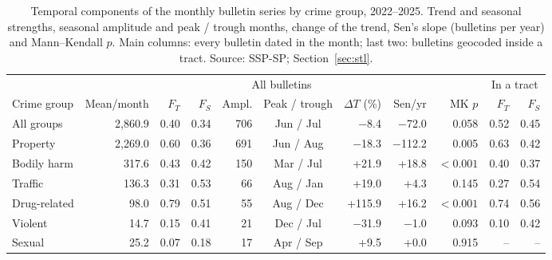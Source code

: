\begin{table}[!ht]
\caption{Temporal components of the monthly bulletin series by crime group, 2022--2025. Trend and seasonal strengths, seasonal amplitude and peak / trough months, change of the trend, Sen's slope (bulletins per year) and Mann--Kendall $p$. Main columns: every bulletin dated in the month; last two: bulletins geocoded inside a tract. Source: SSP-SP; Section~\ref{sec:stl}.}
\label{tab:stl}
\centering\footnotesize
\begin{tabular}{@{}lrrrrcrrrrr@{}}
\hline\hline
 & \multicolumn{8}{c}{All bulletins} & \multicolumn{2}{c}{In a tract} \\
Crime group & Mean/month & $F_T$ & $F_S$ & Ampl. & Peak / trough & $\Delta T$ (\%) & Sen/yr & MK $p$ & $F_T$ & $F_S$ \\
\hline
All groups & 2,860.9 & 0.40 & 0.34 & 706 & Jun / Jul & $-$8.4 & $-$72.0 & 0.058 & 0.52 & 0.45 \\
Property & 2,269.0 & 0.60 & 0.36 & 691 & Jun / Aug & $-$18.3 & $-$112.2 & 0.005 & 0.63 & 0.42 \\
Bodily harm & 317.6 & 0.43 & 0.42 & 150 & Mar / Jul & +21.9 & +18.8 & $<0.001$ & 0.40 & 0.37 \\
Traffic & 136.3 & 0.31 & 0.53 & 66 & Aug / Jan & +19.0 & +4.3 & 0.145 & 0.27 & 0.54 \\
Drug-related & 98.0 & 0.79 & 0.51 & 55 & Aug / Dec & +115.9 & +16.2 & $<0.001$ & 0.74 & 0.56 \\
Violent & 14.7 & 0.15 & 0.41 & 21 & Dec / Jul & $-$31.9 & $-$1.0 & 0.093 & 0.10 & 0.42 \\
Sexual & 25.2 & 0.07 & 0.18 & 17 & Apr / Sep & +9.5 & +0.0 & 0.915 & -- & -- \\
\hline\hline
\end{tabular}
\end{table}
